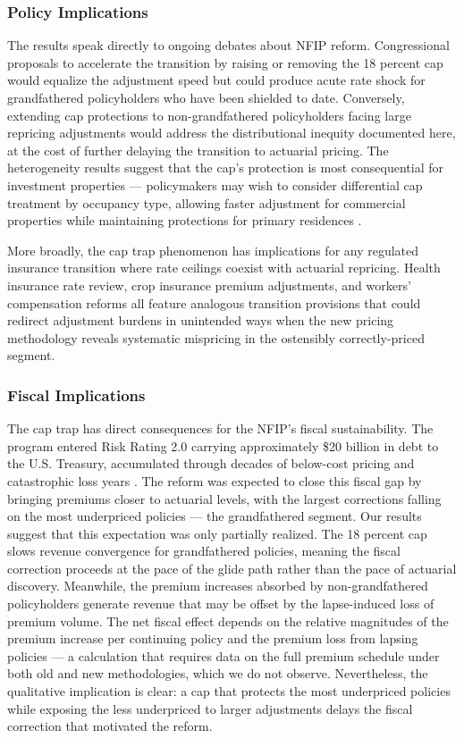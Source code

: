 \documentclass[12pt]{article}
\begin{document}
\subsubsection*{Policy Implications} The results speak directly to ongoing debates about NFIP reform. Congressional proposals to accelerate the transition by raising or removing the 18 percent cap would equalize the adjustment speed but could produce acute rate shock for grandfathered policyholders who have been shielded to date. Conversely, extending cap protections to non-grandfathered policyholders facing large repricing adjustments would address the distributional inequity documented here, at the cost of further delaying the transition to actuarial pricing. The heterogeneity results suggest that the cap's protection is most consequential for investment properties --- policymakers may wish to consider differential cap treatment by occupancy type, allowing faster adjustment for commercial properties while maintaining protections for primary residences \citep{davlasheridze2017}.

More broadly, the cap trap phenomenon has implications for any regulated insurance transition where rate ceilings coexist with actuarial repricing. Health insurance rate review, crop insurance premium adjustments, and workers' compensation reforms all feature analogous transition provisions that could redirect adjustment burdens in unintended ways when the new pricing methodology reveals systematic mispricing in the ostensibly correctly-priced segment.

\subsubsection*{Fiscal Implications} The cap trap has direct consequences for the NFIP's fiscal sustainability. The program entered Risk Rating 2.0 carrying approximately \$20 billion in debt to the U.S. Treasury, accumulated through decades of below-cost pricing and catastrophic loss years \citep{horn2018}. The reform was expected to close this fiscal gap by bringing premiums closer to actuarial levels, with the largest corrections falling on the most underpriced policies --- the grandfathered segment. Our results suggest that this expectation was only partially realized. The 18 percent cap slows revenue convergence for grandfathered policies, meaning the fiscal correction proceeds at the pace of the glide path rather than the pace of actuarial discovery. Meanwhile, the premium increases absorbed by non-grandfathered policyholders generate revenue that may be offset by the lapse-induced loss of premium volume. The net fiscal effect depends on the relative magnitudes of the premium increase per continuing policy and the premium loss from lapsing policies --- a calculation that requires data on the full premium schedule under both old and new methodologies, which we do not observe. Nevertheless, the qualitative implication is clear: a cap that protects the most underpriced policies while exposing the less underpriced to larger adjustments delays the fiscal correction that motivated the reform.
\end{document}
